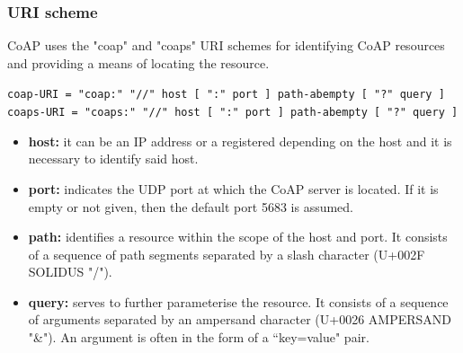 \documentclass[11pt]{book}
\begin{document}
\subsubsection{URI scheme}
CoAP uses the "coap" and "coaps" URI schemes for identifying CoAP resources and providing a means of locating the resource. 
\begin{center}
\texttt{coap-URI = "coap:" "//" host [ ":" port ] path-abempty [ "?" query ]}\\
\texttt{coaps-URI = "coaps:" "//" host [ ":" port ] path-abempty
               [ "?" query ]}
\end{center}
\begin{itemize}
\item \textbf{host:} it can be an IP address or a registered depending on the host and it is necessary to identify said host. 
\item \textbf{port:} indicates the UDP port at which the CoAP server is located.  If it is empty or not given, then the default port 5683 is assumed.
\item \textbf{path:} identifies a resource within the scope of the host and port. It consists of a sequence of path segments separated by a slash character (U+002F SOLIDUS "/").
\item \textbf{query:} serves to further parameterise the resource.  It consists of a sequence of arguments separated by an ampersand character (U+0026 AMPERSAND "\&").  An argument is often in the form of a ``key=value" pair.
\end{itemize}
\end{document}
